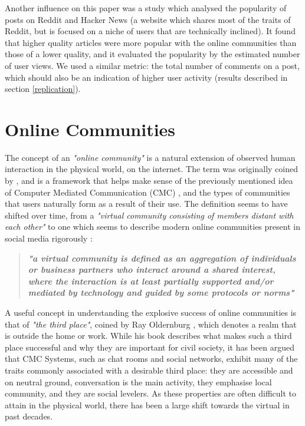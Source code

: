 \documentclass[bsc,frontabs,twoside,singlespacing,parskip,deptreport]{infthesis}
\begin{document}
Another influence on this paper was a study \cite{StoddardGreg2015PaQi} which analysed the popularity of posts on Reddit and Hacker News (a website which shares most of the traits of Reddit, but is focused on a niche of users that are technically inclined). It found that higher quality articles were more popular with the online communities than those of a lower quality, and it evaluated the popularity by the estimated number of user views. We used a similar metric: the total number of comments on a post, which should also be an indication of higher user activity (results described in section \ref{replication}).

\section{Online Communities}\label{online-communities}  
 The concept of an \textit{"online community"} is a natural extension of observed human interaction in the physical world, on the internet. The term was originally coined by \cite{HiltzStarrRoxanne1984Oc:a}, and is a framework that helps make sense of the previously mentioned idea of Computer Mediated Communication (CMC) \cite{HerringSusanC2004STtO}, and the types of communities that users naturally form as a result of their use. The definition seems to have shifted over time, from a \textit{"virtual community consisting of members distant with each other"} \cite{masters}\cite{RheingoldHoward1994Tvc:} to one which seems to describe modern online communities present in social media rigorously \cite{PorterConstanceElise2004AToV}: \\
 
\begin{quotation}
\textbf{\textit{"a virtual community is defined as an aggregation of individuals or business partners who interact around a shared interest, where the interaction is at least partially supported and/or mediated by technology and guided by some protocols or norms"}}
\end{quotation}

A useful concept in understanding the explosive success of online communities is that of \textit{"the third place"}, coined by Ray Oldernburg \cite{oldenburg1999the}, which denotes a realm that is outside the home or work. While his book describes what makes such a third place successful and why they are important for civil society, it has been argued \cite{SoukupCharles2006Ccaa} that CMC Systems, such as chat rooms and social networks, exhibit many of the traits commonly associated with a desirable third place: they are accessible and on neutral ground, conversation is the main activity, they emphasise local community, and they are social levelers. As these properties are often difficult to attain in the physical world, there has been a large shift towards the virtual in past decades.
\end{document}
